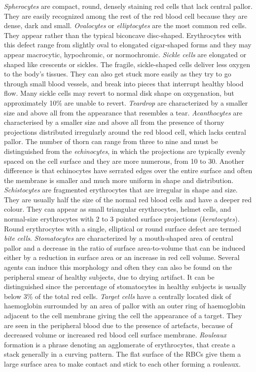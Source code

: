 \textit{Spherocytes} are compact, round, densely staining red cells that lack central pallor. They are easily recognized among the rest of the red blood cell because they are dense, dark and small. \textit{Ovalocytes} or \textit{elliptocytes} are the most common red cells. They appear rather than the typical biconcave disc-shaped. Erythrocytes with this defect range from slightly oval to elongated cigar-shaped forms and they may appear macrocytic, hypochromic, or normochromic.  \textit{Sickle cells} are elongated or shaped like crescents or sickles. The fragile, sickle-shaped cells deliver less oxygen to the body's tissues. They can also get stuck more easily as they try to go through small blood vessels, and break into pieces that interrupt healthy blood flow. Many sickle cells may revert to normal disk shape on oxygenation, but approximately 10\% are unable to revert.
\textit{Teardrop} are characterized by a smaller size and above all from the appearance that resembles a tear. \textit{Acanthocytes} are characterised by a smaller size and above all from the presence of thorny projections distributed irregularly around the red blood cell, which lacks central pallor. The number of thorn can range from three to nine and must be distinguished from the \textit{echinocytes}, in which the projections are typically evenly spaced on the cell surface and they are more numerous, from 10 to 30. Another difference is that echinocytes have serrated edges over the entire surface and often the membrane is smaller and much more uniform in shape and distribution. \textit{Schistocytes} are fragmented erythrocytes  that are irregular in shape and size. They are usually half the size of the normal red blood cells and have a deeper red colour. They can appear as small triangular erythrocytes, helmet cells, and normal-size erythrocytes with 2 to 3 pointed surface  projections (\textit{keratocytes}). Round erythrocytes with a single, elliptical or round surface defect are termed \textit{bite cells}. \textit{Stomatocytes} are characterized by a mouth-shaped area of central pallor and a decrease in the ratio of surface area-to-volume that can be induced either by a reduction in surface area or an increase in red cell volume. Several agents can induce this morphology and often they can also be found on the peripheral smear of healthy subjects, due to drying artifact. It can be distinguished since the percentage of stomatocytes in healthy subjects is usually below 3\% of the total red cells. \textit{Target cells} have a centrally located disk of haemoglobin surrounded by an area of pallor with an outer ring of haemoglobin adjacent to the cell membrane giving the cell the appearance of a target. They are seen in the peripheral blood due to the presence of artefacts, because of decreased volume or increased red blood cell surface membrane. \textit{Rouleaux} formation is a phrase denoting an agglomerate of erythrocytes, that create a stack generally in a curving pattern. The flat surface of the RBCs give them a large surface area to make contact and stick to each other forming a rouleaux. 

